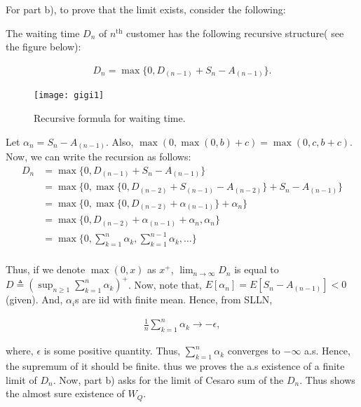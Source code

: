 \documentclass[12,a4paper,onecolumn]{article}
\begin{document}
For part b), to prove that the limit exists, consider the following:

The waiting time $D_n$ of $n^{\text{th}}$ customer has the following recursive structure( see the figure below): 

\begin{align*}
D_n=\max\{0,D_{(n-1)}+S_n-A_{(n-1)}\}.
\end{align*} 
 \begin{figure}[h]
 \hspace{40pt}
\texttt{[image: gigi1]}
\hspace{40pt}\caption{Recursive formula for waiting time.}
 \end{figure}
 
 Let $\alpha_n=S_n-A_{(n-1)}$. Also, $\max(0, \max(0,b)+c)=\max(0,c,b+c)$. Now, we can write the recursion as follows:\\
 
\begin{align*}
D_n&=\max\{0,D_{(n-1)}+S_n-A_{(n-1)}\}\\
&=\max\{0,\max\{0,D_{(n-2)}+S_{(n-1)}-A_{(n-2)}\}+S_n-A_{(n-1)}\}\\
&=\max\{0,\max\{0,D_{(n-2)}+\alpha_{(n-1)} \}+\alpha_n\}\\
&=\max\{0,D_{(n-2)}+\alpha_{(n-1)}+\alpha_n,\alpha_n \}\\
&=\max\{0,\sum_{k=1}^{n}\alpha_k,\sum_{k=1}^{n-1}\alpha_k,\hdots\}\\
\end{align*}
 
 Thus, if we denote $\max(0,x)$ as $x^+$, $\lim_{n \rightarrow \infty}D_n$ is equal to $D \triangleq (\sup_{n \geq 1}\sum_{k=1}^{n}\alpha_k)^+$. Now, note that, $E[\alpha_n]=E[S_n-A_{(n-1)}]<0$ (given). And, $\alpha_i$s are iid with finite mean. Hence, from SLLN, 
 
 \begin{align*}
\frac{1}{n}\sum_{k=1}^{n}\alpha_k \rightarrow -\epsilon, 
\end{align*}

where, $\epsilon $ is some positive quantity. Thus, $\sum_{k=1}^{n}\alpha_k$ converges to $-\infty$ a.s. Hence, the supremum of it should be finite. thus we proves the a.s existence of a finite limit of $D_n$. Now, part b) asks for the limit of Cesaro sum of the $D_n$. Thus shows the almost sure existence of $W_Q$. 
\end{document}
